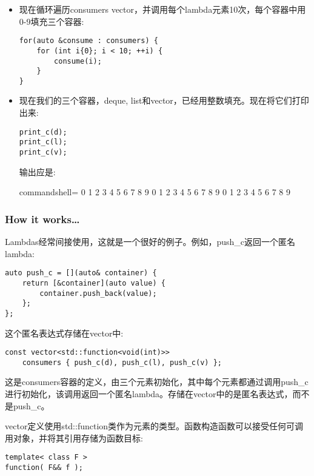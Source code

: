 \begin{itemize}
\item 
现在循环遍历consumers vector，并调用每个lambda元素10次，每个容器中用0-9填充三个容器:

\begin{lstlisting}[style=styleCXX]
for(auto &consume : consumers) {
	for (int i{0}; i < 10; ++i) {
		consume(i);
	}
}
\end{lstlisting}

\item 
现在我们的三个容器，deque, list和vector，已经用整数填充。现在将它们打印出来:

\begin{lstlisting}[style=styleCXX]
print_c(d);
print_c(l);
print_c(v);
\end{lstlisting}

输出应是:

\begin{tcblisting}{commandshell={}}
0 1 2 3 4 5 6 7 8 9
0 1 2 3 4 5 6 7 8 9
0 1 2 3 4 5 6 7 8 9
\end{tcblisting}
\end{itemize}

\subsubsection{How it works…}

Lambdas经常间接使用，这就是一个很好的例子。例如，push\_c返回一个匿名lambda:

\begin{lstlisting}[style=styleCXX]
auto push_c = [](auto& container) {
	return [&container](auto value) {
		container.push_back(value);
	};
};
\end{lstlisting}

这个匿名表达式存储在vector中:

\begin{lstlisting}[style=styleCXX]
const vector<std::function<void(int)>>
	consumers { push_c(d), push_c(l), push_c(v) };
\end{lstlisting}

这是consumers容器的定义，由三个元素初始化，其中每个元素都通过调用push\_c进行初始化，该调用返回一个匿名lambda。存储在vector中的是匿名表达式，而不是push\_c。

vector定义使用std::function类作为元素的类型。函数构造函数可以接受任何可调用对象，并将其引用存储为函数目标:

\begin{lstlisting}[style=styleCXX]
template< class F >
function( F&& f );
\end{lstlisting}

